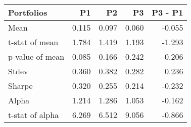 \begin{tabular}{lrrrr}
\toprule
Portfolios & P1 & P2 & P3 & P3 - P1 \\
\midrule
Mean & 0.115 & 0.097 & 0.060 & -0.055 \\
t-stat of mean & 1.784 & 1.419 & 1.193 & -1.293 \\
p-value of mean & 0.085 & 0.166 & 0.242 & 0.206 \\
Stdev & 0.360 & 0.382 & 0.282 & 0.236 \\
Sharpe & 0.320 & 0.255 & 0.214 & -0.232 \\
Alpha & 1.214 & 1.286 & 1.053 & -0.162 \\
t-stat of alpha & 6.269 & 6.512 & 9.056 & -0.866 \\
\bottomrule
\end{tabular}
